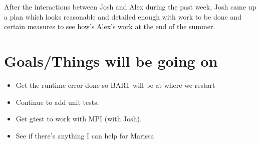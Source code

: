 \documentclass{article}
\begin{document}
After the interactions between Josh and Alex during the past week, Josh came up a plan which
looks reasonable and detailed enough with work to be done and certain measures to see how's 
Alex's work at the end of the summer.


\section{Goals/Things will be going on}
\begin{itemize}
	\item Get the runtime error done so BART will be at where we restart
	\item Continue to add unit tests.
	\item Get gtest to work with MPI (with Josh).
	\item See if there's anything I can help for Marissa
\end{itemize}




%
%
%

\end{document}
